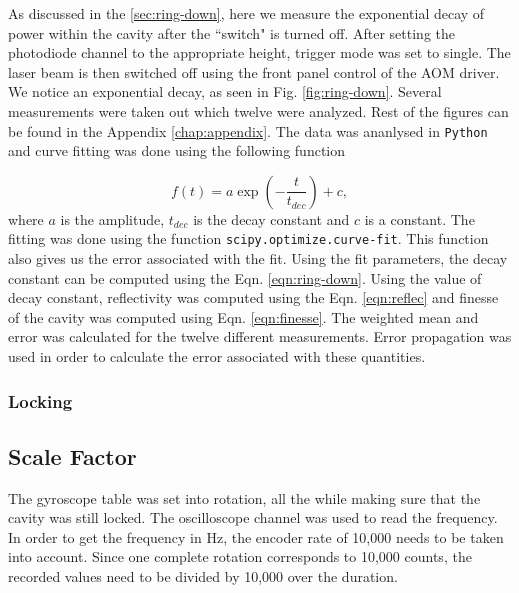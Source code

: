 \documentclass[a4paper]{report}
\numberwithin{equation}{section}
\begin{document}
As discussed in the \ref{sec:ring-down}, here we measure the exponential decay of power within the cavity after the ``switch" is turned off. After setting the photodiode channel to the appropriate height, trigger mode was set to single. The laser beam is then switched off using the front panel control of the AOM driver. We notice an exponential decay, as seen in Fig. \ref{fig:ring-down}. Several measurements were taken out which twelve were analyzed. Rest of the figures can be found in the Appendix \ref{chap:appendix}. The data was ananlysed in \texttt{Python} and curve fitting was done using the following function

\begin{equation}
		f(t) = a \exp\left(-\frac{t}{t_{dec}}\right) + c,
\end{equation}
where $a$ is the amplitude, $t_{dec}$ is the decay constant and $c$ is a constant. The fitting was done using the function \texttt{scipy.optimize.curve-fit}. This function also gives us the error associated with the fit. Using the fit parameters, the decay constant can be computed using the Eqn. \ref{eqn:ring-down}. Using the value of decay constant, reflectivity was computed using the Eqn. \ref{eqn:reflec} and finesse of the cavity was computed using Eqn. \ref{eqn:finesse}. The weighted mean and error was calculated for the twelve different measurements. Error propagation was used in order to calculate the error associated with these quantities.


\subsubsection{Locking}



\subsection{Scale Factor} \label{sec:scale_fact}
The gyroscope table was set into rotation, all the while making sure that the cavity was still locked. The oscilloscope channel was used to read the frequency. In order to get the frequency in Hz, the encoder rate of 10,000 needs to be taken into account. Since one complete rotation corresponds to 10,000 counts, the recorded values need to be divided by 10,000 over the duration. 
\end{document}
